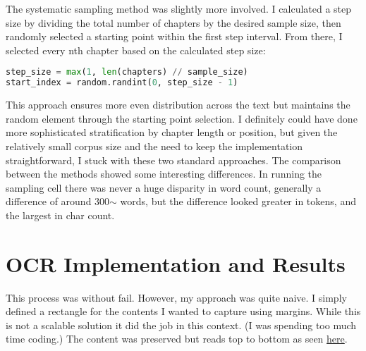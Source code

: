 \documentclass[12pt]{article}
\begin{document}
The systematic sampling method was slightly more involved. I calculated a step size by dividing the total number of chapters by the desired sample size, then randomly selected a starting point within the first step interval. From there, I selected every nth chapter based on the calculated step size:

\begin{lstlisting}[language=Python]
step_size = max(1, len(chapters) // sample_size)
start_index = random.randint(0, step_size - 1)
\end{lstlisting}

This approach ensures more even distribution across the text but maintains the random element through the starting point selection. I definitely could have done more sophisticated stratification by chapter length or position, but given the relatively small corpus size and the need to keep the implementation straightforward, I stuck with these two standard approaches. The comparison between the methods showed some interesting differences. In running the sampling cell there was never a huge disparity in word count, generally a difference of around 300$\sim$ words, but the difference looked greater in tokens, and the largest in char count.

\section*{OCR Implementation and Results}

This process was without fail. However, my approach was quite naive. I simply defined a rectangle for the contents I wanted to capture using margins. While this is not a scalable solution it did the job in this context. (I was spending too much time coding.) The content was preserved but reads top to bottom as seen \href{https://github.com/marobinette/NaturalLanguageProcessing/blob/main/hw/week_4/OCR_me_electricalengineering_processed.txt}{here}.
\end{document}
